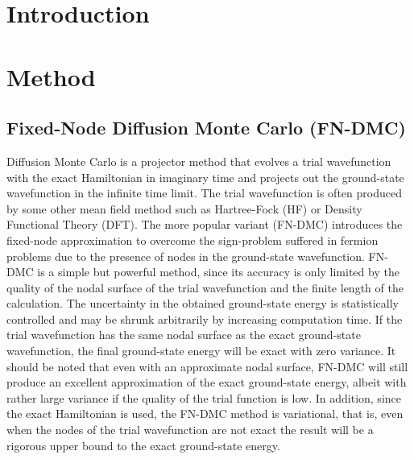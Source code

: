 \documentclass[aps,prl,superscriptaddress,groupedaddress]{revtex4}
\begin{document}


\maketitle

\section{Introduction}


\section{Method}

\subsection{Fixed-Node Diffusion Monte Carlo (FN-DMC)}
Diffusion Monte Carlo is a projector method that evolves a trial wavefunction with the exact Hamiltonian in imaginary time and projects out the ground-state wavefunction in the infinite time limit. The trial wavefunction is often produced by some other mean field method such as Hartree-Fock (HF) or Density Functional Theory (DFT). The more popular variant (FN-DMC) introduces the fixed-node approximation to overcome the sign-problem suffered in fermion problems due to the presence of nodes in the ground-state wavefunction. FN-DMC is a simple but powerful method, since its accuracy is only limited by the quality of the nodal surface of the trial wavefunction and the finite length of the calculation. The uncertainty in the obtained ground-state energy is statistically controlled and may be shrunk arbitrarily by increasing computation time. If the trial wavefunction has the same nodal surface as the exact ground-state wavefunction, the final ground-state energy will be exact with zero variance. It should be noted that even with an approximate nodal surface, FN-DMC will still produce an excellent approximation of the exact ground-state energy, albeit with rather large variance if the quality of the trial function is low. In addition, since the exact Hamiltonian is used, the FN-DMC method is variational, that is, even when the nodes of the trial wavefunction are not exact the result will be a rigorous upper bound to the exact ground-state energy.
\end{document}
